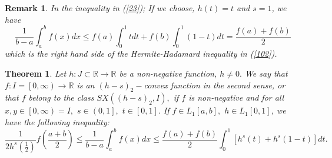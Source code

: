 \documentclass{amsart}
\newtheorem{theorem}{Theorem}
\theoremstyle{plain}
\newtheorem{remark}{Remark}
\numberwithin{equation}{section}
\begin{document}
\begin{remark}
In the inequality in (\ref{23}); If we choose, $h(t)=t$ and $s=1$, we have\begin{equation*}
\frac{1}{b-a}\int_{a}^{b}f(x)dx\leq
f(a)\int_{0}^{1}tdt+f(b)\int_{0}^{1}\left( 1-t\right) dt=\frac{f(a)+f(b)}{2}
\end{equation*}which is the right hand side of the Hermite-Hadamard inequality in (\ref{102}).
\end{remark}

\begin{theorem}
\label{th2} Let $h:J\subset 
\mathbb{R}
\rightarrow 
\mathbb{R}
$ be a non-negative function, $h\neq 0.$ We say that $f:I=\left[ 0,\infty
\right) \rightarrow 
\mathbb{R}
$ is an $(h-s)_{2}-$convex function in the second sense, or that $f$ belong
to the class $SX(\left( h-s\right) _{2},I),$ if $f$ is non-negative and for
all $x,y\in \left[ 0,\infty \right) =I,$ $s\in \left( 0,1\right] ,$ $t\in \left[ 0,1\right] .$ If $f\in L_{1}\left[ a,b\right] ,$ $h\in L_{1}\left[ 0,1\right] $, we have the following inequality:\begin{equation}
\frac{1}{2h^{s}\left( \frac{1}{2}\right) }f\left( \frac{a+b}{2}\right) \leq 
\frac{1}{b-a}\int_{a}^{b}f(x)dx\leq \frac{f(a)+f(b)}{2}\int_{0}^{1}\left[
h^{s}\left( t\right) +h^{s}\left( 1-t\right) \right] dt.  \label{25}
\end{equation}
\end{theorem}
\end{document}
